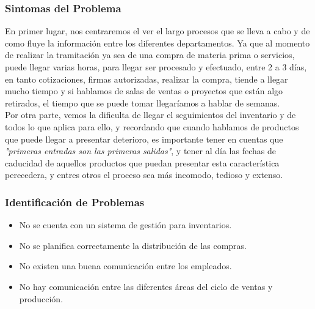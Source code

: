 \documentclass[12pt]{article}
\begin{document}
\vspace{0.5cm}

\subsubsection{ Sintomas del Problema }
\begin{center}
\begin{minipage}{14cm}

  En primer lugar, nos centraremos el ver el largo procesos que se lleva a
  cabo y de como fluye la información entre los diferentes departamentos.
  Ya que al momento de realizar la tramitación ya sea de una compra de 
  materia prima o servicios, puede llegar varias horas, para llegar ser
  procesado y efectuado, entre 2 a 3 días, en tanto cotizaciones, firmas 
  autorizadas, realizar la compra, tiende a llegar mucho tiempo y si hablamos
  de salas de ventas o proyectos que están algo retirados, el tiempo que
  se puede tomar llegaríamos a hablar de semanas.\\

  Por otra parte, vemos la dificulta de llegar el seguimientos del inventario
  y de todos lo que aplica para ello, y recordando que cuando hablamos de 
  productos que puede llegar a presentar deterioro, es importante tener en
  cuentas que \textit{"primeras entradas son las primeras salidas"}, y tener
  al día las fechas de caducidad de aquellos productos que puedan presentar
  esta característica perecedera, y entres otros el proceso sea más incomodo,
  tedioso y extenso.

\end{minipage}
\end{center}

\vspace{0.5cm}

\subsubsection{ Identificación de Problemas}
\begin{center}
\begin{minipage}{14cm}
  \begin{itemize}
    \item No se cuenta con un sistema de gestión para inventarios.
    \item No se planifica correctamente la distribución de las compras.
    \item No existen una buena comunicación entre los empleados.
    \item No hay comunicación entre las diferentes áreas del ciclo de ventas
      y producción. 
  \end{itemize}

\end{minipage}
\end{center}
\end{document}
